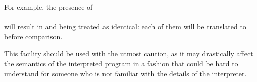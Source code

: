 For example, the presence of\\
\ind{}\\
will result in  and  being treated as
identical: each of them will be translated to  before
comparison.

\begin{Warning}
This facility should be used with the utmost caution, as it may drastically
affect the semantics of the interpreted program in a fashion that could be
hard to understand for someone who is not familiar with the details of the
interpreter.
\end{Warning}

